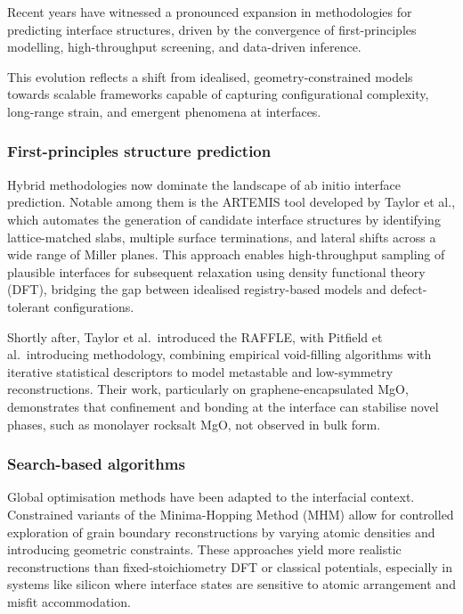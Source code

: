 Recent years have witnessed a pronounced expansion in methodologies for predicting interface structures, driven by the convergence of first-principles modelling, high-throughput screening, and data-driven inference.

This evolution reflects a shift from idealised, geometry-constrained models towards scalable frameworks capable of capturing configurational complexity, long-range strain, and emergent phenomena at interfaces.

\subsubsection{First-principles structure prediction}

Hybrid methodologies now dominate the landscape of ab initio interface prediction. Notable among them is the \textsc{ARTEMIS} tool developed by Taylor et al., which automates the generation of candidate interface structures by identifying lattice-matched slabs, multiple surface terminations, and lateral shifts across a wide range of Miller planes. This approach enables high-throughput sampling of plausible interfaces for subsequent relaxation using density functional theory (DFT), bridging the gap between idealised registry-based models and defect-tolerant configurations.

Shortly after, Taylor et al.\ introduced the \textsc{RAFFLE}, with Pitfield et al.\ introducing methodology, combining empirical void-filling algorithms with iterative statistical descriptors to model metastable and low-symmetry reconstructions. Their work, particularly on graphene-encapsulated MgO, demonstrates that confinement and bonding at the interface can stabilise novel phases, such as monolayer rocksalt MgO, not observed in bulk form.

\subsubsection{Search-based algorithms}

Global optimisation methods have been adapted to the interfacial context. Constrained variants of the Minima-Hopping Method (MHM) allow for controlled exploration of grain boundary reconstructions by varying atomic densities and introducing geometric constraints. These approaches yield more realistic reconstructions than fixed-stoichiometry DFT or classical potentials, especially in systems like silicon where interface states are sensitive to atomic arrangement and misfit accommodation.


